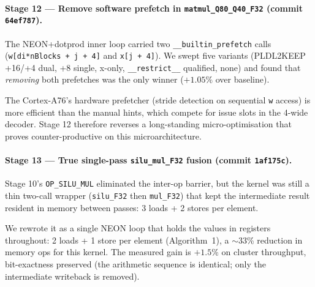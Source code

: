 \documentclass[10pt,a4paper]{article}
\begin{document}
\paragraph{Stage 12 --- Remove software prefetch in \texttt{matmul\_Q80\_Q40\_F32} (commit \texttt{64ef787}).}
The NEON+dotprod inner loop carried two \texttt{\_\_builtin\_prefetch} calls (\texttt{w[di*nBlocks + j + 4]} and \texttt{x[j + 4]}). We swept five variants (PLDL2KEEP +16/+4 dual, +8 single, x-only, \texttt{\_\_restrict\_\_} qualified, none) and found that \emph{removing} both prefetches was the only winner ($+1.05\%$ over baseline).

The Cortex-A76's hardware prefetcher (stride detection on sequential \texttt{w} access) is more efficient than the manual hints, which compete for issue slots in the 4-wide decoder. Stage 12 therefore reverses a long-standing micro-optimisation that proves counter-productive on this microarchitecture.

\paragraph{Stage 13 --- True single-pass \texttt{silu\_mul\_F32} fusion (commit \texttt{1af175c}).}
Stage 10's \texttt{OP\_SILU\_MUL} eliminated the inter-op barrier, but the kernel was still a thin two-call wrapper (\texttt{silu\_F32} then \texttt{mul\_F32}) that kept the intermediate result resident in memory between passes: 3 loads + 2 stores per element.

We rewrote it as a single NEON loop that holds the values in registers throughout: 2 loads + 1 store per element (Algorithm~1), a $\sim$33\% reduction in memory ops for this kernel. The measured gain is $+1.5\%$ on cluster throughput, bit-exactness preserved (the arithmetic sequence is identical; only the intermediate writeback is removed).
\end{document}
